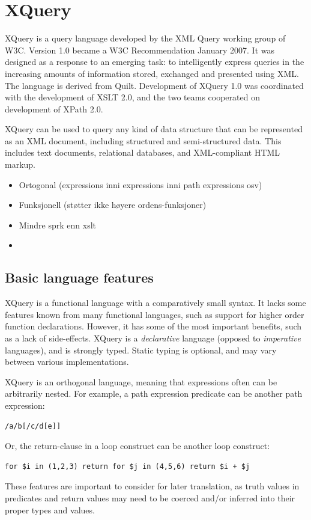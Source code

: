 \section{XQuery}
\label{sect:theory:xquery}

XQuery is a query language developed by the XML Query working group of W3C.
Version 1.0\cite{w3c00} became a W3C Recommendation January 2007. It was
designed as a response to an emerging task: to intelligently express queries in
the increasing amounts of information stored, exchanged and presented using
XML. The language is derived from Quilt\cite{quilt_queryLanguage}. Development
of XQuery 1.0 was coordinated with the development of XSLT 2.0, and the two
teams cooperated on development of XPath 2.0.

XQuery can be used to query any kind of data structure that can be represented
as an XML document, including structured and semi-structured data. This
includes text documents, relational databases, and XML-compliant HTML markup.

\begin{itemize}
  \item Ortogonal (expressions inni expressions inni path expressions osv)
  \item Funksjonell (st\o tter ikke h\o yere ordens-funksjoner)
  \item Mindre spr\a k enn xslt
  \item 
\end{itemize}


\subsection{Basic language features}
\label{sect:theory:xquery:basics}
XQuery is a functional language with a comparatively small syntax. It lacks
some features known from many functional languages, such as support for higher
order function declarations. However, it has some of the most important
benefits, such as a lack of side-effects. XQuery is a \textit{declarative}
language (opposed to \textit{imperative} languages), and is strongly typed.
Static typing is optional, and may vary between various implementations.

XQuery is an orthogonal language, meaning that expressions often can be
arbitrarily nested. For example, a path expression predicate can be another
path expression:
  \begin{verbatim}
/a/b[/c/d[e]]
  \end{verbatim}
Or, the return-clause in a loop construct can be another loop
construct:
  \begin{verbatim}
for $i in (1,2,3) return for $j in (4,5,6) return $i + $j
  \end{verbatim}
These features are important to consider for later translation, as truth values
in predicates and return values may need to be coerced and/or inferred into
their proper types and values.


